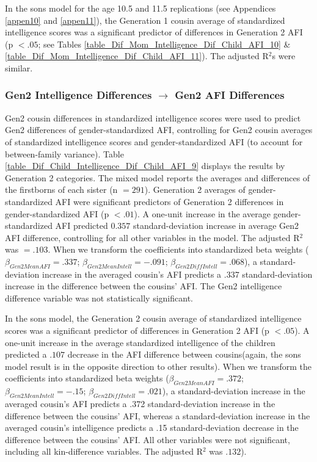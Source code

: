 \documentclass[a4paper,man,apacite,natbib,12pt,longtable]{apa6}\usepackage[]{graphicx}\usepackage[]{color}
\begin{document}
In the sons model for the age 10.5 and 11.5 replications (see Appendices \ref{appen10} and \ref{appen11}), the Generation 1 cousin average of standardized intelligence scores was a significant predictor of differences in Generation 2 AFI (p $< .05$; see Tables \ref{table_Dif_Mom_Intelligence_Dif_Child_AFI_10} \& \ref{table_Dif_Mom_Intelligence_Dif_Child_AFI_11}). The adjusted R$^{2}$s were similar. 

\subsubsection{Gen2 Intelligence Differences $\rightarrow$ Gen2 AFI Differences}
Gen2 cousin differences in standardized intelligence scores were used to predict Gen2 differences of gender-standardized AFI, controlling for Gen2 cousin averages of standardized intelligence scores and gender-standardized AFI (to account for between-family variance). Table \ref{table_Dif_Child_Intelligence_Dif_Child_AFI_9} displays the results by Generation 2 categories. The mixed model reports the averages and differences of the firstborns of each sister (n $= 291$). Generation 2 averages of gender-standardized AFI were significant predictors of Generation 2 differences in gender-standardized AFI (p $< .01$). A one-unit increase in the average gender-standardized AFI predicted $0.357$ standard-deviation increase in average Gen2 AFI difference, controlling for all other variables in the model. The adjusted R$^{2}$ was $= .103$. When we transform the coefficients into standardized beta weights ($\beta_{Gen2 Mean AFI} = .337$; $\beta_{Gen2 Mean Intell} = -.091$; $\beta_{Gen2 Diff Intell} = .068$), a standard-deviation increase in the averaged cousin's AFI predicts a .337 standard-deviation increase in the difference between the cousins' AFI. The Gen2 intelligence difference variable was not statistically significant.

In the sons model, the Generation 2 cousin average of standardized intelligence scores was a significant predictor of differences in Generation 2 AFI (p $< .05$). A one-unit increase in the average standardized intelligence of the children predicted a $.107$ decrease in the AFI difference between cousins(again, the sons model result is in the opposite direction to other results). When we transform the coefficients into standardized beta weights ($\beta_{Gen2 Mean AFI} = .372$; $\beta_{Gen2 Mean Intell} = -.15$; $\beta_{Gen2 Diff Intell} = .021$), a standard-deviation increase in the averaged cousin's AFI predicts a .372 standard-deviation increase in the difference between the cousins' AFI, whereas a standard-deviation increase in the averaged cousin's intelligence predicts a .15 standard-deviation decrease in the difference between the cousins' AFI. All other variables were not significant, including all kin-difference variables. The adjusted R$^{2}$ was $.132$). 
\end{document}
